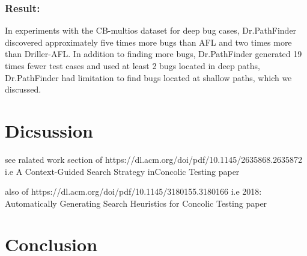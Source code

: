 \documentclass[	runningheads,
				a4paper]{llncs}
\begin{document}
\subsubsection{Result:}
In experiments with the CB-multios dataset for deep bug cases, Dr.PathFinder discovered approximately five
times more bugs than AFL and two times more than Driller-AFL. In addition to finding more bugs, Dr.PathFinder
generated 19 times fewer test cases and used at least 2%
bugs located in deep paths, Dr.PathFinder had limitation to find bugs located at shallow paths, which we discussed.


\section{Dicsussion}
see ralated work section of https://dl.acm.org/doi/pdf/10.1145/2635868.2635872
i.e A Context-Guided Search Strategy inConcolic Testing paper

also of https://dl.acm.org/doi/pdf/10.1145/3180155.3180166
i.e 2018: Automatically Generating Search Heuristics for Concolic Testing paper


\section{Conclusion}







	
\end{document}
